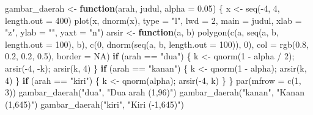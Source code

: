 \documentclass[
  indonesian,
  letterpaper,
]{book}
\newenvironment{Shaded}{\begin{snugshade}}{\end{snugshade}}
\newcommand{\AttributeTok}[1]{\textcolor[rgb]{0.40,0.45,0.13}{#1}}
\newcommand{\ConstantTok}[1]{\textcolor[rgb]{0.56,0.35,0.01}{#1}}
\newcommand{\ControlFlowTok}[1]{\textcolor[rgb]{0.00,0.23,0.31}{\textbf{#1}}}
\newcommand{\DecValTok}[1]{\textcolor[rgb]{0.68,0.00,0.00}{#1}}
\newcommand{\FloatTok}[1]{\textcolor[rgb]{0.68,0.00,0.00}{#1}}
\newcommand{\FunctionTok}[1]{\textcolor[rgb]{0.28,0.35,0.67}{#1}}
\newcommand{\NormalTok}[1]{\textcolor[rgb]{0.00,0.23,0.31}{#1}}
\newcommand{\OtherTok}[1]{\textcolor[rgb]{0.00,0.23,0.31}{#1}}
\newcommand{\SpecialCharTok}[1]{\textcolor[rgb]{0.37,0.37,0.37}{#1}}
\newcommand{\StringTok}[1]{\textcolor[rgb]{0.13,0.47,0.30}{#1}}
\begin{document}
\begin{Shaded}
\begin{Highlighting}[]
\NormalTok{gambar\_daerah }\OtherTok{\textless{}{-}} \ControlFlowTok{function}\NormalTok{(arah, judul, }\AttributeTok{alpha =} \FloatTok{0.05}\NormalTok{) \{}
\NormalTok{x }\OtherTok{\textless{}{-}} \FunctionTok{seq}\NormalTok{(}\SpecialCharTok{{-}}\DecValTok{4}\NormalTok{, }\DecValTok{4}\NormalTok{, }\AttributeTok{length.out =} \DecValTok{400}\NormalTok{)}
\FunctionTok{plot}\NormalTok{(x, }\FunctionTok{dnorm}\NormalTok{(x), }\AttributeTok{type =} \StringTok{"l"}\NormalTok{, }\AttributeTok{lwd =} \DecValTok{2}\NormalTok{, }\AttributeTok{main =}\NormalTok{ judul, }\AttributeTok{xlab =} \StringTok{"z"}\NormalTok{, }\AttributeTok{ylab =} \StringTok{""}\NormalTok{, yaxt}
\OtherTok{=} \StringTok{"n"}\NormalTok{)}
\NormalTok{arsir }\OtherTok{\textless{}{-}} \ControlFlowTok{function}\NormalTok{(a, b) }\FunctionTok{polygon}\NormalTok{(}\FunctionTok{c}\NormalTok{(a, }\FunctionTok{seq}\NormalTok{(a, b, }\AttributeTok{length.out =} \DecValTok{100}\NormalTok{), b),}
\FunctionTok{c}\NormalTok{(}\DecValTok{0}\NormalTok{, }\FunctionTok{dnorm}\NormalTok{(}\FunctionTok{seq}\NormalTok{(a, b, }\AttributeTok{length.out =} \DecValTok{100}\NormalTok{)), }\DecValTok{0}\NormalTok{),}
\AttributeTok{col =} \FunctionTok{rgb}\NormalTok{(}\FloatTok{0.8}\NormalTok{, }\FloatTok{0.2}\NormalTok{, }\FloatTok{0.2}\NormalTok{, }\FloatTok{0.5}\NormalTok{), }\AttributeTok{border =} \ConstantTok{NA}\NormalTok{)}
\ControlFlowTok{if}\NormalTok{ (arah }\SpecialCharTok{==} \StringTok{"dua"}\NormalTok{) \{ k }\OtherTok{\textless{}{-}} \FunctionTok{qnorm}\NormalTok{(}\DecValTok{1} \SpecialCharTok{{-}}\NormalTok{ alpha }\SpecialCharTok{/} \DecValTok{2}\NormalTok{); }\FunctionTok{arsir}\NormalTok{(}\SpecialCharTok{{-}}\DecValTok{4}\NormalTok{, }\SpecialCharTok{{-}}\NormalTok{k); }\FunctionTok{arsir}\NormalTok{(k, }\DecValTok{4}\NormalTok{) \}}
\ControlFlowTok{if}\NormalTok{ (arah }\SpecialCharTok{==} \StringTok{"kanan"}\NormalTok{) \{ k }\OtherTok{\textless{}{-}} \FunctionTok{qnorm}\NormalTok{(}\DecValTok{1} \SpecialCharTok{{-}}\NormalTok{ alpha); }\FunctionTok{arsir}\NormalTok{(k, }\DecValTok{4}\NormalTok{) \}}
\ControlFlowTok{if}\NormalTok{ (arah }\SpecialCharTok{==} \StringTok{"kiri"}\NormalTok{) \{ k }\OtherTok{\textless{}{-}} \FunctionTok{qnorm}\NormalTok{(alpha); }\FunctionTok{arsir}\NormalTok{(}\SpecialCharTok{{-}}\DecValTok{4}\NormalTok{, k) \}}
\NormalTok{\}}
\FunctionTok{par}\NormalTok{(}\AttributeTok{mfrow =} \FunctionTok{c}\NormalTok{(}\DecValTok{1}\NormalTok{, }\DecValTok{3}\NormalTok{))}
\FunctionTok{gambar\_daerah}\NormalTok{(}\StringTok{"dua"}\NormalTok{, }\StringTok{"Dua arah (1,96)"}\NormalTok{)}
\FunctionTok{gambar\_daerah}\NormalTok{(}\StringTok{"kanan"}\NormalTok{, }\StringTok{"Kanan (1,645)"}\NormalTok{)}
\FunctionTok{gambar\_daerah}\NormalTok{(}\StringTok{"kiri"}\NormalTok{, }\StringTok{"Kiri ({-}1,645)"}\NormalTok{)}
\end{Highlighting}
\end{Shaded}
\end{document}
